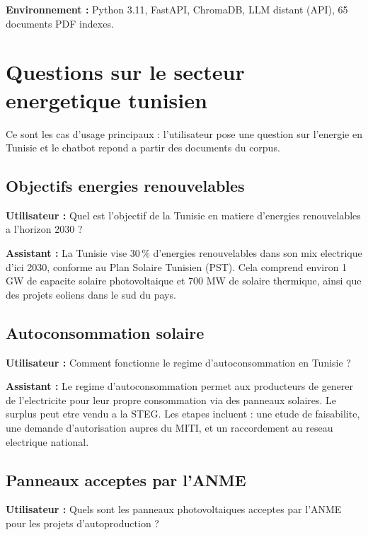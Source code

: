 \documentclass[12pt,a4paper,oneside]{article}
\newcommand{\prompt}[1]{%
  \noindent\colorbox{PromptBg}{\parbox{\dimexpr\linewidth-2\fboxsep}{%
    \small\textbf{\textcolor{MainBlue}{Utilisateur :}} #1%
  }}\vspace{3pt}%
}
\newcommand{\botreply}[1]{%
  \noindent\colorbox{OutputBg}{\parbox{\dimexpr\linewidth-2\fboxsep}{%
    \small\textbf{\textcolor{PassGreen!70!black}{Assistant :}} #1%
  }}\vspace{6pt}%
}
\begin{document}
\bigskip\noindent\textbf{Environnement :} Python 3.11, FastAPI, ChromaDB, LLM distant (API), 65 documents PDF indexes.

\clearpage

\section{Questions sur le secteur energetique tunisien}

Ce sont les cas d'usage principaux : l'utilisateur pose une question sur l'energie en Tunisie et le chatbot repond a partir des documents du corpus.

\subsection{Objectifs energies renouvelables}

\prompt{Quel est l'objectif de la Tunisie en matiere d'energies renouvelables a l'horizon 2030 ?}

\botreply{
La Tunisie vise 30\,\% d'energies renouvelables dans son mix electrique d'ici 2030, conforme au Plan Solaire Tunisien (PST). Cela comprend environ 1 GW de capacite solaire photovoltaique et 700 MW de solaire thermique, ainsi que des projets eoliens dans le sud du pays.
}

\subsection{Autoconsommation solaire}

\prompt{Comment fonctionne le regime d'autoconsommation en Tunisie ?}

\botreply{
Le regime d'autoconsommation permet aux producteurs de generer de l'electricite pour leur propre consommation via des panneaux solaires. Le surplus peut etre vendu a la STEG. Les etapes incluent : une etude de faisabilite, une demande d'autorisation aupres du MITI, et un raccordement au reseau electrique national.
}

\subsection{Panneaux acceptes par l'ANME}

\prompt{Quels sont les panneaux photovoltaiques acceptes par l'ANME pour les projets d'autoproduction ?}
\end{document}
